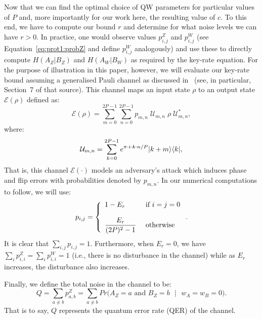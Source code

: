 Now that we can find the optimal choice of QW parameters for particular values of $P$ and, more importantly for our work here, the resulting value of $c$. To this end, we have to compute our bound $r$ and determine for what noise levels we can have $r > 0$.  
In practice, one would observe values $p_{i,j}^Z$ and $p_{i,j}^W$ (see Equation~\eqref{eq:prot1:probZ} and define $p_{i,j}^W$ analogously) and use these to directly compute $H(A_Z|B_Z)$ and $H(A_W|B_W)$ as required by the key-rate equation.  For the purpose of illustration in this paper, however, we will evaluate our key-rate bound assuming a generalised Pauli channel as discussed in~\cite{bae:aci:07} (see, in particular, Section~7 of that source). This channel maps an input state $\rho$ to an output state $\mathcal{E}(\rho)$ defined as:
\begin{equation}\label{eq:prot1-channel}
\mathcal{E}(\rho) = \sum_{m=0}^{2P-1}\sum_{n=0}^{2P-1}p_{m,n}\;\mathcal{U}_{m,n}\;\rho\;\mathcal{U}_{m,n}^*,
\end{equation}
where:
\begin{equation}
\mathcal{U}_{m,n} = \sum_{k=0}^{2P-1}e^{{\pi \cdot i \cdot  k \cdot n}/{P}}| k+m \rangle\langle k |,
\end{equation}
That is, this channel $\mathcal{E}(\cdot)$ models an adversary's attack which induces phase and flip errors with probabilities denoted by $p_{m,n}$.  In our numerical computations to follow, we will use:
\begin{equation}\label{eq:prot1-channelpr}
p_{i,j} = \left\{
\begin{array}{ll}
	1-E_r & \text{ if } i = j = 0\\[4mm]
	\displaystyle \frac{E_r}{(2P)^2-1} & \text{ otherwise}
\end{array}
\right. .
\end{equation}
It is clear that $\sum_{i,j}p_{i,j} = 1$.  Furthermore, when $E_r=0$, we have $\sum_ip_{i,i}^Z = \sum_ip_{i,i}^W = 1$ (i.e., there is no disturbance in the channel) while as $E_r$ increases, the disturbance also increases.

Finally, we define the total noise in the channel to be:
\[
Q = \sum_{a\ne b}p_{a,b}^Z = \sum_{a\ne b} Pr \big( A_Z=a \text{ and } B_Z = b \text{ } | \text{ } w_A = w_B = 0 \big).
\]
That is to say, $Q$ represents the quantum error rate (QER) of the channel.

